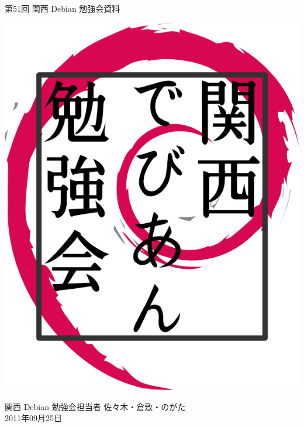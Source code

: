 \documentclass[mingoth,a4paper]{jsarticle}
\newcommand{\debmtgyear}{2011}
\newcommand{\debmtgmonth}{09}
\newcommand{\debmtgdate}{25}
\newcommand{\debmtgnumber}{51}
\begin{document}
\begin{titlepage}


 第\debmtgnumber{}回 関西 Debian 勉強会資料

\vspace{2cm}

\begin{center}
\includegraphics{image200802/kansaidebianlogo.png}
\end{center}

\begin{flushright}
\hfill{}関西 Debian 勉強会担当者 佐々木・倉敷・のがた \\
\hfill{}\debmtgyear{}年\debmtgmonth{}月\debmtgdate{}日
\end{flushright}

\thispagestyle{empty}
\end{titlepage}


\subsection*{}%
\end{document}
